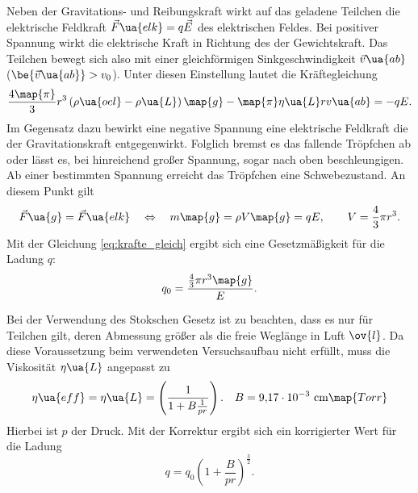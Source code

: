 Neben der Gravitations- und Reibungskraft wirkt auf das geladene Teilchen
die elektrische Feldkraft $\vec{F}\ua{elk}=q\vec{E}$ des elektrischen Feldes.
Bei positiver Spannung wirkt die elektrische Kraft in Richtung des der Gewichtskraft.
Das Teilchen bewegt sich also mit einer gleichförmigen Sinkgeschwindigkeit $\vec{v}\ua{ab}$ ($\be{\vec{v}\ua{ab}}>v_0$).
Unter diesen Einstellung lautet die Kräftegleichung
\begin{equation}
  \label{eq:kraefte_eins}
    \frac{4\map{\pi}}{3}r^3\left(\rho\ua{oel}-\rho\ua{L}\right)\map{g}-\map{\pi}\eta\ua{L}r v\ua{ab}=-qE.
\end{equation}
Im Gegensatz dazu bewirkt eine negative Spannung eine elektrische Feldkraft die der Gravitationskraft
entgegenwirkt. Folglich bremst es das fallende Tröpfchen ab oder
lässt es, bei hinreichend großer Spannung, sogar nach oben beschleungigen.
Ab einer bestimmten Spannung erreicht das Tröpfchen eine Schwebezustand. An diesem
Punkt gilt
\begin{equation}
  \label{eq:krafte_gleich}
  \vec{F}\ua{g}=\vec{F}\ua{elk} \quad \Leftrightarrow \quad m\map{g}=\rho V\map{g}=qE, \qquad V=\frac{4}{3}\pi r^3.
\end{equation}
Mit der Gleichung \eqref{eq:krafte_gleich} ergibt sich eine Gesetzmäßigkeit für die Ladung $q$:
\begin{equation}
  \label{eq:q}
  q_0=\frac{\frac{4}{3}\pi r^3 \map{g}}{E}.
\end{equation}


Bei der Verwendung des Stokschen Gesetz ist zu beachten, dass es nur für Teilchen gilt,
deren Abmessung größer als die freie Weglänge in Luft $\ov{l}$.
Da diese Voraussetzung beim verwendeten Versuchsaufbau nicht erfüllt, muss die Viskosität $\eta\ua{L}$
angepasst zu
\begin{equation*}
  \eta\ua{eff}=\eta\ua{L}=\left(\frac{1}{1+B\frac{1}{pr}}\right). \quad B=\SI{9.17e-3}\,\si{\centi\meter}\map{Torr}
\end{equation*}
Hierbei ist $p$ der Druck. Mit der Korrektur ergibt sich ein korrigierter Wert für die Ladung
\begin{equation}
  \label{eq:q_korri}
  q=q_0\left(1+\frac{B}{pr}\right)^{\frac{3}{2}}.
\end{equation}
